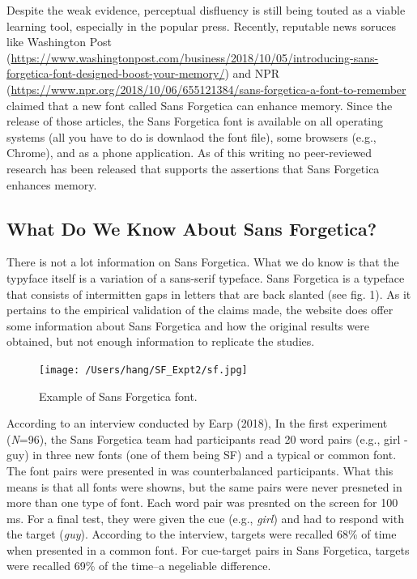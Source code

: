 \documentclass[english,doc]{apa6}
\begin{document}
Despite the weak evidence, perceptual disfluency is still being touted as a viable learning tool, especially in the popular press. Recently, reputable news soruces like Washington Post (\url{https://www.washingtonpost.com/business/2018/10/05/introducing-sans-forgetica-font-designed-boost-your-memory/}) and NPR (\url{https://www.npr.org/2018/10/06/655121384/sans-forgetica-a-font-to-remember} claimed that a new font called Sans Forgetica can enhance memory. Since the release of those articles, the Sans Forgetica font is available on all operating systems (all you have to do is downlaod the font file), some browsers (e.g., Chrome), and as a phone application. As of this writing no peer-reviewed research has been released that supports the assertions that Sans Forgetica enhances memory.

\hypertarget{what-do-we-know-about-sans-forgetica}{%
\subsection{What Do We Know About Sans Forgetica?}\label{what-do-we-know-about-sans-forgetica}}

There is not a lot information on Sans Forgetica. What we do know is that the typyface itself is a variation of a sans-serif typeface. Sans Forgetica is a typeface that consists of intermitten gaps in letters that are back slanted (see fig. 1). As it pertains to the empirical validation of the claims made, the website does offer some information about Sans Forgetica and how the original results were obtained, but not enough information to replicate the studies.

\begin{figure}
\centering
\texttt{[image: /Users/hang/SF\_Expt2/sf.jpg]}
\caption{\label{fig:unnamed-chunk-1}Example of Sans Forgetica font.}
\end{figure}

According to an interview conducted by Earp (2018), In the first experiment (\emph{N}=96), the Sans Forgetica team had participants read 20 word pairs (e.g., girl - guy) in three new fonts (one of them being SF) and a typical or common font. The font pairs were presented in was counterbalanced participants. What this means is that all fonts were showns, but the same pairs were never presneted in more than one type of font. Each word pair was presnted on the screen for 100 ms. For a final test, they were given the cue (e.g., \emph{girl}) and had to respond with the target (\emph{guy}). According to the interview, targets were recalled 68\% of time when presented in a common font. For cue-target pairs in Sans Forgetica, targets were recalled 69\% of the time--a negeliable difference.
\end{document}
